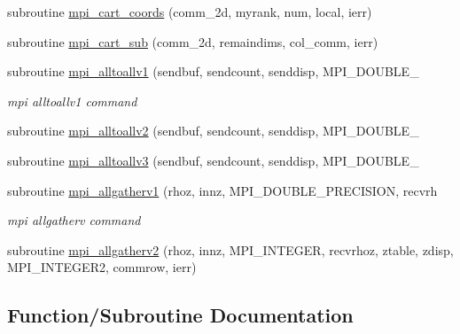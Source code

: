 \begin{DoxyCompactItemize}
subroutine \mbox{\hyperlink{namespacempistub_a599bb38fd4a9f405ced50d48c09116ca}{mpi\+\_\+cart\+\_\+coords}} (comm\+\_\+2d, myrank, num, local, ierr)
\item 
subroutine \mbox{\hyperlink{namespacempistub_ab9ac48f74bbcdf05669e63852a220c09}{mpi\+\_\+cart\+\_\+sub}} (comm\+\_\+2d, remaindims, col\+\_\+comm, ierr)
\item 
subroutine \mbox{\hyperlink{namespacempistub_aa93ced1f07150fe7c8d11a35a0b77b1f}{mpi\+\_\+alltoallv1}} (sendbuf, sendcount, senddisp, M\+P\+I\+\_\+\+D\+O\+U\+B\+L\+E\+\_\+
\begin{DoxyCompactList}\small\item\em mpi alltoallv1 command \end{DoxyCompactList}\item 
subroutine \mbox{\hyperlink{namespacempistub_ac85c372d1990a0cfd2b6cb31a0be0b47}{mpi\+\_\+alltoallv2}} (sendbuf, sendcount, senddisp, M\+P\+I\+\_\+\+D\+O\+U\+B\+L\+E\+\_\+
\item 
subroutine \mbox{\hyperlink{namespacempistub_a9e2b2b4a1d6bda704e33a2acfcfb9cfd}{mpi\+\_\+alltoallv3}} (sendbuf, sendcount, senddisp, M\+P\+I\+\_\+\+D\+O\+U\+B\+L\+E\+\_\+
\item 
subroutine \mbox{\hyperlink{namespacempistub_a35fa927935bbf54e76460692ed2ae189}{mpi\+\_\+allgatherv1}} (rhoz, innz, M\+P\+I\+\_\+\+D\+O\+U\+B\+L\+E\+\_\+\+P\+R\+E\+C\+I\+S\+I\+ON, recvrh
\begin{DoxyCompactList}\small\item\em mpi allgatherv command \end{DoxyCompactList}\item 
subroutine \mbox{\hyperlink{namespacempistub_a107fe42e9088982af86dbfe11fe0ac33}{mpi\+\_\+allgatherv2}} (rhoz, innz, M\+P\+I\+\_\+\+I\+N\+T\+E\+G\+ER, recvrhoz, ztable, zdisp, M\+P\+I\+\_\+\+I\+N\+T\+E\+G\+E\+R2, commrow, ierr)
\end{DoxyCompactItemize}


\subsection{Function/\+Subroutine Documentation}
\mbox{\label{namespacempistub_a61c97c834a766b0372d758a4158ae7da}} 
